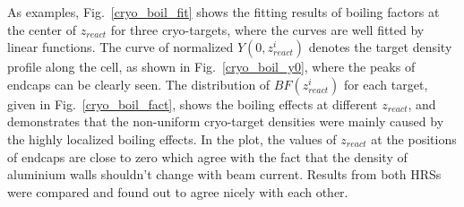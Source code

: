 As examples, Fig.~\ref{cryo_boil_fit} shows the fitting results of boiling factors at the center of $z_{react}$ for three cryo-targets, where the curves are well fitted by linear functions. The curve of normalized $Y(0, z_{react}^{i})$ denotes the target density profile along the cell, as shown in Fig.~\ref{cryo_boil_y0}, where the peaks of endcaps can be clearly seen. The distribution of $BF(z_{react}^{i})$ for each target, given in Fig.~\ref{cryo_boil_fact}, shows the boiling effects at different $z_{react}$, and demonstrates that the non-uniform cryo-target densities were mainly caused by the highly localized boiling effects. In the plot, the values of $z_{react}$ at the positions of endcaps are close to zero which agree with the fact that the density of aluminium walls shouldn't change with beam current. Results from both HRSs were compared and found out to agree nicely with each other. 
